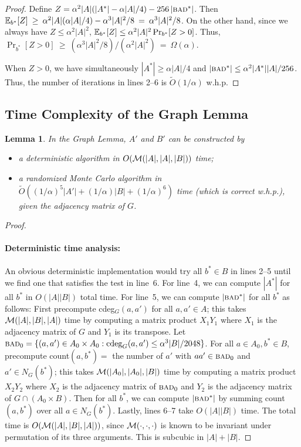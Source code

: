 \documentclass[11pt]{article}
\newtheorem{lemma}[theorem]{Lemma}
\newcommand{\OO}{\widetilde{O}}
\begin{document}
{\begin{proof}
Define $Z = \alpha^2 |A| (|A^*| - \alpha |A|/4)  - 256\,|\textsc{bad}^*|$.
Then $\mathbb{E}_{b^*}[Z] \:\geq\:  \alpha^2 |A| (\alpha |A|/4) - \alpha^3 |A|^2/8
\:=\: \alpha^3 |A|^2/8$.
On the other hand, since we always have $Z \leq  \alpha^2 |A|^2$,
$\mathbb{E}_{b^*}[Z] \leq  \alpha^2 |A|^2 \Pr_{b^*}[Z > 0]$.
Thus, $\Pr_{b^*}[Z > 0] \:\geq\: (\alpha^3 |A|^2/8)/(\alpha^2 |A|^2) \:=\: \Omega(\alpha)$.

When $Z > 0$, we have simultaneously
$|A^*|\ge\alpha |A|/4$ and $|\textsc{bad}^*|\le \alpha^2 |A^*| |A|/256$.
Thus, the number of iterations in lines 2--6 is $\OO(1/\alpha)$ w.h.p.
\end{proof}


\subsection{Time Complexity of the Graph Lemma}\label{sec-graph-time}


\begin{lemma}\label{lem-graph-runtime}
In the Graph Lemma, $A'$ and $B'$ can be constructed by

\begin{itemize}
\item
a deterministic algorithm in $O({\cal M}(|A|,|A|,|B|))$ time;
\item
a randomized Monte Carlo algorithm in $\OO((1/\alpha)^5 |A'| + (1/\alpha)|B| + (1/\alpha)^6)$ time
(which is correct w.h.p.), given the adjacency matrix of $G$.
\end{itemize}
\end{lemma}

\begin{proof}\


\paragraph{Deterministic time analysis:}
An obvious deterministic implementation would try
all $b^* \in B$ in lines 2--5 until we find one that satisfies
the test in line~6.
For line~4, we can compute $|A^*|$ for all $b^*$ in
$O(|A||B|)$ total time.
For line~5, we can compute $|\textsc{bad}^*|$ for all $b^*$ as follows:
First precompute cdeg$_G(a,a')$ for all $a,a' \in A$; this takes
${\cal M}(|A|,|B|,|A|)$ time by
computing a matrix product $X_1Y_1$ where
$X_1$ is the adjacency matrix of $G$
and $Y_1$ is its transpose.
Let $\textsc{bad}_0=\{(a,a')\in A_0\times A_0: \textrm{cdeg}_G(a,a') \leq  \alpha^3 |B|/2048\}$.
For all $a\in A_0,b^*\in B$, precompute count$(a,b^*) = $
the number of $a'$ with $aa'\in\textsc{bad}_0$ and $a'\in N_G(b^*)$;
this takes ${\cal M}(|A_0|,|A_0|,|B|)$ time by
computing a matrix product $X_2Y_2$ where
$X_2$ is the adjacency matrix of $\textsc{bad}_0$ and
$Y_2$ is the adjacency matrix of $G\cap (A_0\times B)$.
Then for all $b^*$, we can compute $|\textsc{bad}^*|$ by summing
count$(a,b^*)$ over all $a\in N_G(b^*)$.
Lastly, lines 6--7 take $O(|A||B|)$ time.
The total time is $O({\cal M}(|A|,|B|,|A|))$, since ${\cal M}(\cdot,\cdot,\cdot)$
is known to be invariant under permutation of its three arguments.
This is subcubic in $|A|+|B|$.



\end{proof}}
\end{document}

